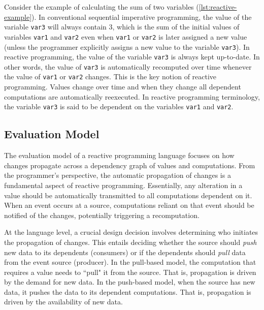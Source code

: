 \documentclass[12pt,a4paper,openright,twoside]{book}
\begin{document}
Consider the example of calculating the sum of two variables (\cref{lst:reactive-example}). In conventional sequential imperative programming, the value of the variable \texttt{var3} will always contain 3, which is the sum of the initial values of variables \texttt{var1} and \texttt{var2} even when \texttt{var1} or \texttt{var2} is later assigned a new value (unless the programmer explicitly assigns a new value to the variable \texttt{var3}). In reactive programming, the value of the variable \texttt{var3} is always kept up-to-date. In other words, the value of \texttt{var3} is automatically recomputed over time whenever the value of \texttt{var1} or \texttt{var2} changes.
This is the key notion of reactive programming. Values change over time and when they change all dependent computations are automatically reexecuted. In reactive programming terminology, the variable \texttt{var3} is said to be dependent on the variables \texttt{var1} and \texttt{var2}.



\subsection{Evaluation Model}

The evaluation model of a reactive programming language focuses on how changes propagate across a dependency graph of values and computations. From the programmer's perspective, the automatic propagation of changes is a fundamental aspect of reactive programming. Essentially, any alteration in a value should be automatically transmitted to all computations dependent on it. When an event occurs at a source, computations reliant on that event should be notified of the changes, potentially triggering a recomputation.

At the language level, a crucial design decision involves determining who initiates the propagation of changes. This entails deciding whether the source should \textit{push} new data to its dependents (consumers) or if the dependents should \textit{pull} data from the event source (producer). In the pull-based model, the computation that requires a value needs to ``pull" it from the source. That is, propagation is driven by the demand for new data. In the push-based model, when the source has new data, it pushes the data to its dependent computations. That is, propagation is driven by the availability of new data.
\end{document}
